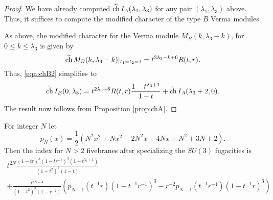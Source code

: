 \documentclass[11pt]{amsart}
\begin{document}
\begin{proof}
We have already computed $\widetilde {{\rm ch}} \, I_A(\lambda_1,\lambda_3)$ for any pair $(\lambda_1,\lambda_3)$ above. 
Thus, it suffices to compute the modified character of the type $B$ Verma modules.

As above, the modified character for the Verma module $M_B(k,\lambda_3-k)$, for $0 \leq k \leq \lambda_3$ is given by
\[
\widetilde {{\rm ch}} \, M_B(k,\lambda_3-k)|_{t_1=t_2=1} = t^{3 \lambda_3 - k + 6} R(t,r) .
\]
Thus, \eqref{eqn:chB2} simplifies to 
\[
\widetilde {{\rm ch}} \, I_B(0,\lambda_3) = t^{2 \lambda_3 + 6} R(t,r) \frac{1-t^{\lambda_3+1}}{1 - t} + \widetilde {{\rm ch}} \, I_{A}(\lambda_3+2,0) .
\]
The result now follows from Proposition \ref{prop:chA}.
\end{proof}



\parsec[s:typeBunrefinedKR]


For integer $N$ let 
\[
p_{N}(x) = \frac12 \left(N^2 x^2 + N x^2 - 2N^2x -4 N x + N^2 + 3N +2\right) .
\]
Then the index for $N > 2$ fivebranes after specializing the $SU(3)$ fugacities is
\begin{multline}
t^{2 N} \frac{(1-tr)^3 (1-tr^{-1})^3 (1-t^{\lambda_3+1})}{(1-t^2)^3(1 - t)} \\ + \frac{t^{2N + 4}}{(1-t^2)^3 (1-r^{-2})} \left(p_{N-1} (t^{-1} r) (1 - t^{-1} r^{-1})^3 - r^{-2} p_{N-1}(t^{-1} r^{-1})(1-t^{-1}r)^3 \right) 
\end{multline}
\end{document}
